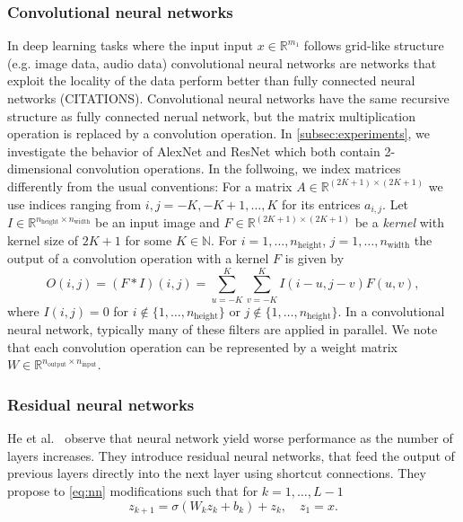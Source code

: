 \documentclass[12pt]{article}
\theoremstyle{definition}
\numberwithin{equation}{section}
\newcommand{\N}{\mathbb{N}}
\newcommand{\R}{\mathbb{R}}
\begin{document}
\subsubsection{Convolutional neural networks}
In deep learning tasks where the input input $x \in \R^{m_1}$ follows grid-like structure (e.g. image data, audio data) convolutional neural networks are networks that exploit the locality of the data perform better than fully connected neural networks (CITATIONS). Convolutional neural networks have the same recursive structure as fully connected nerual network, but the matrix multiplication operation is replaced by a convolution operation.
In \autoref{subsec:experiments}, we investigate the behavior of AlexNet \cite{krizhevskyImageNetClassificationDeep2012} and ResNet \cite{heDeepResidualLearning2016a} which both contain 2-dimensional convolution operations. In the follwoing, we index matrices differently from the usual conventions: For a matrix $A \in \R^{(2K+1)\times(2K+1)}$ we use indices ranging from $i,j=-K, -K+1, \dots, K$ for its entrices $a_{i,j}$.
Let $I \in \R^{n_{\text{height}} \times n_{\text{width}}}$ be an input image and $F \in \R^{(2K+1) \times (2K+1)}$ be a \emph{kernel} with kernel size of $2K+1$ for some $K \in \N$.
For $i=1,\dots, n_{\text{height}}$, $j = 1,\dots, n_{\text{width}}$ the output of a convolution operation with a kernel $F$ is given by
\begin{equation*}
  O(i,j) = (F*I)(i,j) = \sum_{u=-K}^{K}\sum_{v=-K}^{K}I(i-u,j-v)F(u,v),
\end{equation*}
where $I(i,j) = 0$ for $i\notin \{1,\dots,n_{\text{height}}\}$ or $j \notin \{1,\dots,n_{\text{height}}\}$.
In a convolutional neural network, typically many of these filters are applied in parallel. We note that each convolution operation can be represented by a weight matrix $W \in \R^{n_{\text{output}}\times n_{\text{input}}}$. 

\subsubsection{Residual neural networks}
He et al.\ \cite{heDeepResidualLearning2016a} observe that neural network yield worse performance as the number of layers increases. They introduce residual neural networks, that feed the output of previous layers directly into the next layer using shortcut connections. They propose to \eqref{eq:nn} modifications such that for $k=1,\dots,L-1$
\begin{equation*}
  z_{k+1} = \sigma(W_k z_k + b_k) + z_k, \quad z_1 = x.
\end{equation*}
\end{document}
